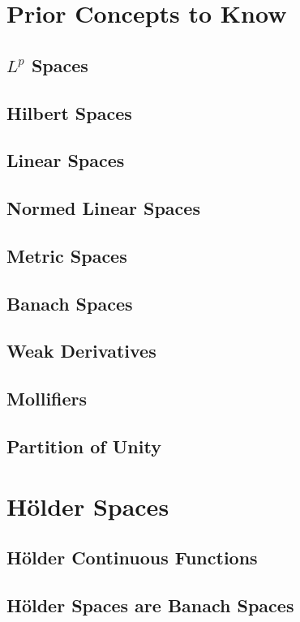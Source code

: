 \documentclass[11pt]{article}
\theoremstyle{definition}
\begin{document}
\pagestyle{fancy}
\fancyhead{}
\tableofcontents
\newpage
\section{Prior Concepts to Know}
\subsection{$L^p$ Spaces}
\subsection{Hilbert Spaces}
\subsection{Linear Spaces}
\subsection{Normed Linear Spaces}
\subsection{Metric Spaces}
\subsection{Banach Spaces}
\subsection{Weak Derivatives}
\subsection{Mollifiers}
\subsection{Partition of Unity}

\newpage

\section{Hölder Spaces}
\subsection{Hölder Continuous Functions}
\subsection{Hölder Spaces are Banach Spaces}
\end{document}
